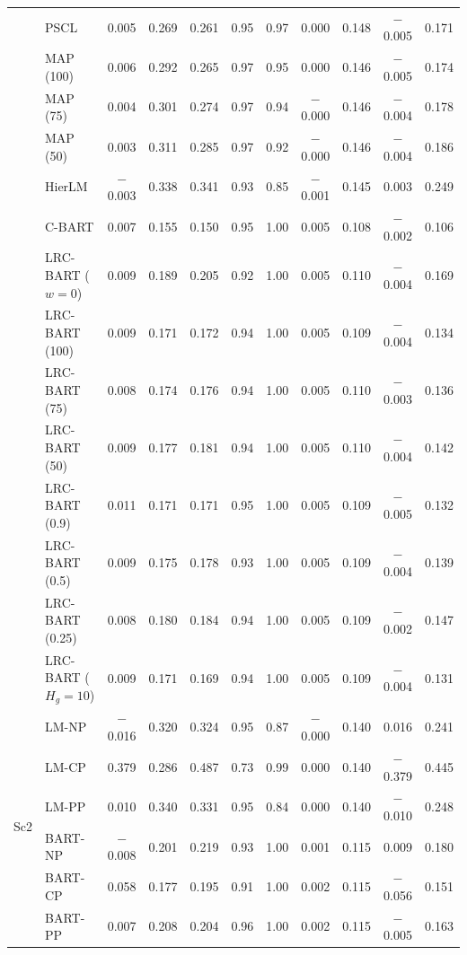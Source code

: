 \documentclass[11pt]{article}
\theoremstyle{definition}
\theoremstyle{plain}
\begin{document}
\begin{center}
\begin{longtable}{llccccccccc}
& PSCL & 0.005 & 0.269 & 0.261 & 0.95 & 0.97 & 0.000 & 0.148 & $-$0.005 & 0.171 \\
& MAP (100) & 0.006 & 0.292 & 0.265 & 0.97 & 0.95 & 0.000 & 0.146 & $-$0.005 & 0.174 \\
& MAP (75) & 0.004 & 0.301 & 0.274 & 0.97 & 0.94 & $-$0.000 & 0.146 & $-$0.004 & 0.178 \\
& MAP (50) & 0.003 & 0.311 & 0.285 & 0.97 & 0.92 & $-$0.000 & 0.146 & $-$0.004 & 0.186 \\
& HierLM & $-$0.003 & 0.338 & 0.341 & 0.93 & 0.85 & $-$0.001 & 0.145 & 0.003 & 0.249 \\
& C-BART & 0.007 & 0.155 & 0.150 & 0.95 & 1.00 & 0.005 & 0.108 & $-$0.002 & 0.106 \\
& LRC-BART ($w=0$) & 0.009 & 0.189 & 0.205 & 0.92 & 1.00 & 0.005 & 0.110 & $-$0.004 & 0.169 \\
& LRC-BART (100) & 0.009 & 0.171 & 0.172 & 0.94 & 1.00 & 0.005 & 0.109 & $-$0.004 & 0.134 \\
& LRC-BART (75) & 0.008 & 0.174 & 0.176 & 0.94 & 1.00 & 0.005 & 0.110 & $-$0.003 & 0.136 \\
& LRC-BART (50) & 0.009 & 0.177 & 0.181 & 0.94 & 1.00 & 0.005 & 0.110 & $-$0.004 & 0.142 \\
& LRC-BART (0.9) & 0.011 & 0.171 & 0.171 & 0.95 & 1.00 & 0.005 & 0.109 & $-$0.005 & 0.132 \\
& LRC-BART (0.5) & 0.009 & 0.175 & 0.178 & 0.93 & 1.00 & 0.005 & 0.109 & $-$0.004 & 0.139 \\
& LRC-BART (0.25) & 0.008 & 0.180 & 0.184 & 0.94 & 1.00 & 0.005 & 0.109 & $-$0.002 & 0.147 \\
& LRC-BART ($H_g=10$) & 0.009 & 0.171 & 0.169 & 0.94 & 1.00 & 0.005 & 0.109 & $-$0.004 & 0.131 \\
\midrule
\multirow{20}{*}{Sc2} & LM-NP & $-$0.016 & 0.320 & 0.324 & 0.95 & 0.87 & $-$0.000 & 0.140 & 0.016 & 0.241 \\
& LM-CP & 0.379 & 0.286 & 0.487 & 0.73 & 0.99 & 0.000 & 0.140 & $-$0.379 & 0.445 \\
& LM-PP & 0.010 & 0.340 & 0.331 & 0.95 & 0.84 & 0.000 & 0.140 & $-$0.010 & 0.248 \\
& BART-NP & $-$0.008 & 0.201 & 0.219 & 0.93 & 1.00 & 0.001 & 0.115 & 0.009 & 0.180 \\
& BART-CP & 0.058 & 0.177 & 0.195 & 0.91 & 1.00 & 0.002 & 0.115 & $-$0.056 & 0.151 \\
& BART-PP & 0.007 & 0.208 & 0.204 & 0.96 & 1.00 & 0.002 & 0.115 & $-$0.005 & 0.163 \\

\end{longtable}
\end{center}
\end{document}
